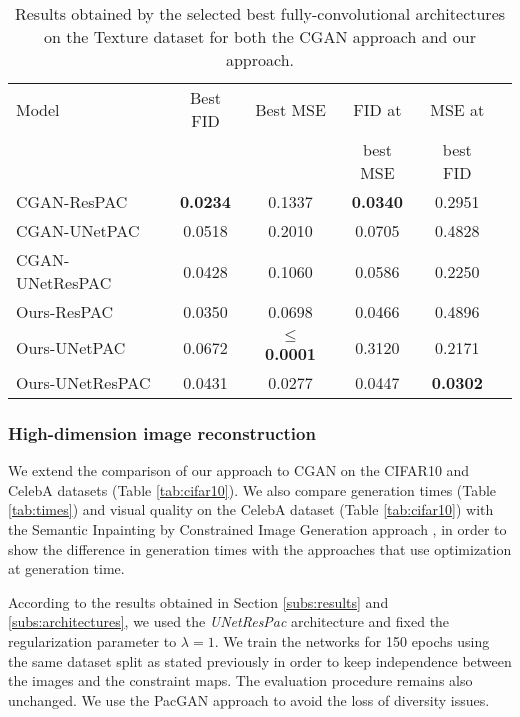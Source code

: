 \begin{table}[t]
	\centering
	\begin{tabular}{l c c c c c}
		\Bigrule
		Model           & Best FID & Best MSE & FID at & MSE at \\
		&&&best MSE & best FID  \\
		\bigrule
		CGAN-ResPAC &   \textbf{0.0234} & 0.1337 &  \textbf{0.0340} & 0.2951 \\
		CGAN-UNetPAC &  0.0518 & 0.2010 & 0.0705 & 0.4828\\
		CGAN-UNetResPAC & 0.0428 & 0.1060 & 0.0586 & 0.2250\\
		\bigrule
		Ours-ResPAC &  0.0350 & 0.0698 & 0.0466 & 0.4896\\
		Ours-UNetPAC &  0.0672 & \textbf{$\leq$ 0.0001}  & 0.3120 & 0.2171 \\
		Ours-UNetResPAC & 0.0431 & 0.0277 &0.0447 & \textbf{0.0302}\\
	\end{tabular}
	
	\caption[Results obtained by the selected best fully-convolutional architectures]{Results obtained by the selected best fully-convolutional architectures on the Texture dataset for both the CGAN approach and our approach.}
	\label{tab:ablation-cgan}
\end{table}

\subsubsection{High-dimension image reconstruction}
We extend the comparison of our approach to CGAN on the CIFAR10 and CelebA  datasets (Table \ref{tab:cifar10}). We also compare generation times (Table \ref{tab:times}) and visual quality on the CelebA dataset (Table \ref{tab:cifar10}) with the Semantic Inpainting by Constrained Image Generation approach \citep{Yeh2017}, in order to show the difference in generation times with the approaches that use optimization at generation time.

 According to the results obtained in Section \ref{subs:results} and \ref{subs:architectures}, we used the \textit{UNetResPac} architecture and fixed the regularization parameter to $\lambda=1$. We train the networks for 150 epochs using the same dataset split as stated previously in order to keep independence between the images and the constraint maps. The evaluation procedure remains also unchanged. We use the PacGAN approach to avoid the loss of diversity issues. 
 
